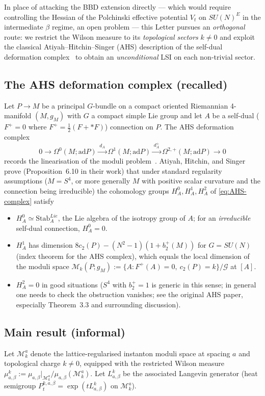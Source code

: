 \documentclass[11pt,a4paper]{amsart}
\theoremstyle{definition}
\newcommand{\ad}{\mathrm{ad}}
\newcommand{\Mmod}{\mathcal{M}}
\begin{document}
In place of attacking the BBD extension directly --- which would require
controlling the Hessian of the Polchinski effective potential
$V_t$ on $SU(N)^E$ in the intermediate $\beta$ regime, an open problem ---
this Letter pursues an \emph{orthogonal} route: we restrict the Wilson
measure to its \emph{topological sectors} $k\neq 0$ and exploit the
classical Atiyah--Hitchin--Singer (AHS) description of the self-dual
deformation complex~\cite{AtiyahHitchinSinger1978} to obtain an
\emph{unconditional} LSI on each non-trivial sector.

\subsection{The AHS deformation complex (recalled)}
Let $P\to M$ be a principal $G$-bundle on a compact oriented Riemannian
4-manifold $(M,g_M)$ with $G$ a compact simple Lie group and let $A$ be a
self-dual ($F^+=0$ where $F^+=\tfrac12(F+\ast F)$) connection on $P$.
The AHS deformation complex
\begin{equation}\label{eq:AHS-complex}
0 \to \Omega^0(M;\ad P)
  \xrightarrow{\,d_A\,} \Omega^1(M;\ad P)
  \xrightarrow{\,d_A^+\,} \Omega^{2,+}(M;\ad P) \to 0
\end{equation}
records the linearisation of the moduli problem~\cite{AtiyahHitchinSinger1978}.
Atiyah, Hitchin, and Singer prove (Proposition~6.10 in their work) that
under standard regularity assumptions ($M=S^4$, or more generally
$M$ with positive scalar curvature and the connection being irreducible)
the cohomology groups $H^0_A, H^1_A, H^2_A$ of \eqref{eq:AHS-complex}
satisfy
\begin{itemize}[leftmargin=2em]
\item $H^0_A \simeq \mathrm{Stab}_A^{Lie}$, the Lie algebra of the
isotropy group of $A$; for an \emph{irreducible} self-dual connection,
$H^0_A = 0$.
\item $H^1_A$ has dimension
$8 c_2(P) - (N^2-1) (1+b^+_2(M))$ for $G=SU(N)$ (index theorem for
the AHS complex),
which equals the local dimension of the moduli space
$\Mmod_k(P;g_M) := \{A : F^+(A)=0,\ c_2(P)=k\}/\mathcal G$ at $[A]$.
\item $H^2_A = 0$ in good situations ($S^4$ with $b^+_2=1$ is generic in
this sense; in general one needs to check the obstruction vanishes; see
the original AHS paper, especially Theorem~3.3 and surrounding discussion).
\end{itemize}

\subsection{Main result (informal)}
Let $\Mmod_k^a$ denote the lattice-regularised instanton moduli space at
spacing $a$ and topological charge $k\neq 0$, equipped with the
restricted Wilson measure
$\mu^k_{a,\beta} := \mu_{a,\beta}|_{\Mmod_k^a}/\mu_{a,\beta}(\Mmod_k^a)$.
Let $L^k_{a,\beta}$ be the associated Langevin generator (heat semigroup
$P^{k,a,\beta}_t = \exp(t L^k_{a,\beta})$ on $\Mmod_k^a$).
\end{document}
